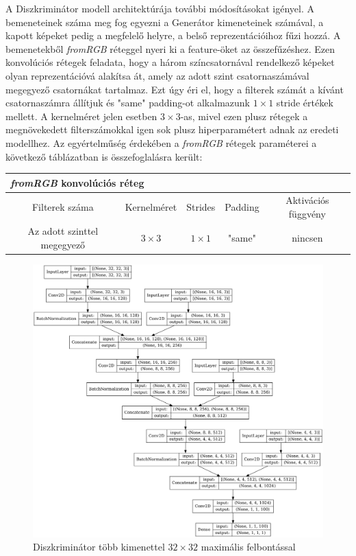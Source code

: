A Diszkriminátor modell architektúrája további módosításokat igényel. A bemeneteinek száma meg fog egyezni a Generátor kimeneteinek számával, a kapott képeket pedig a megfelelő helyre, a belső reprezentációihoz fűzi hozzá. A bemenetekből \textit{fromRGB} réteggel nyeri ki a feature-öket az összefűzéshez.
Ezen konvolúciós rétegek feladata, hogy a három színcsatornával rendelkező képeket olyan reprezentációvá alakítsa át, amely az adott szint csatornaszámával megegyező csatornákat tartalmaz. Ezt úgy éri el, hogy a filterek számát a kívánt csatornaszámra állítjuk és "same" padding-ot alkalmazunk $ 1 \times 1 $ stride értékek mellett. A kernelméret jelen esetben $ 3 \times 3 $-as, mivel ezen plusz rétegek a megnövekedett filterszámokkal igen sok plusz hiperparamétert adnak az eredeti modellhez.
Az egyértelműség érdekében a \textit{fromRGB} rétegek paraméterei a következő táblázatban is összefoglalásra került:
\small{
	\begin{center}
		\begin{tabular}{ c|c|c|c|c }
			\multicolumn{5}{l}{\textbf{\textit{fromRGB} konvolúciós réteg}} \\
			\hline
			Filterek száma & Kernelméret & Strides & Padding & Aktivációs függvény\\
			\hline
			Az adott szinttel megegyező & $3 \times 3$ & $1 \times 1$ & "same" & nincsen\\
		\end{tabular}
	\end{center}
}

\begin{figure}[h]
	\centering
	\includegraphics[width=15cm]{images/msgDiscriminator.png}
	\caption{Diszkriminátor több kimenettel $32 \times 32$ maximális felbontással}
	\label{fig:msgDiscriminator}
\end{figure}


